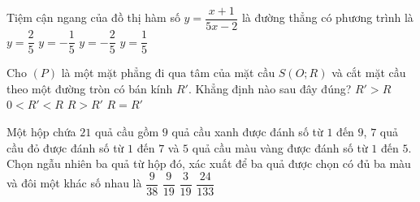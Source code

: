 \begin{ex}%
	Tiệm cận ngang của đồ thị hàm số $y=\dfrac{x+1}{5x-2}$ là đường thẳng có phương trình là
	\choice
	{$y=\dfrac{2}{5}$}
	{$y=-\dfrac{1}{5}$}
	{$y=-\dfrac{2}{5}$}
	{\True $y=\dfrac{1}{5}$}
\end{ex}

\begin{ex}%
	Cho $(P)$ là một mặt phẳng đi qua tâm của mặt cầu $S(O;R)$ và cắt mặt cầu theo một đường tròn có bán kính $R'$. Khẳng định nào sau đây đúng?
	\choice
	{$R'>R$}
	{$0<R'<R$}
	{$R>R'$}
	{\True $R=R'$}
\end{ex}

\begin{ex}%
	Một hộp chứa $21$ quả cầu gồm $9$ quả cầu xanh được đánh số từ $1$ đến $9$, $7$ quả cầu đỏ được đánh số từ $1$ đến $7$ và $5$ quả cầu màu vàng được đánh số từ $1$ đến $5$. Chọn ngẫu nhiên ba quả từ hộp đó, xác xuất để ba quả được chọn có đủ ba màu và đôi một khác số nhau là
	\choice
	{$\dfrac{9}{38}$}
	{$\dfrac{9}{19}$}
	{\True $\dfrac{3}{19}$}
	{$\dfrac{24}{133}$}
\end{ex}

